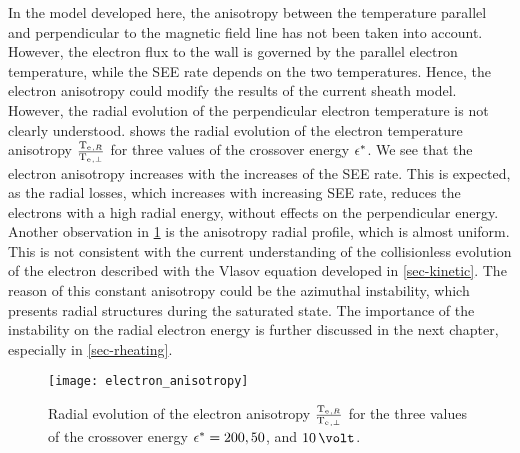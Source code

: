 \vspace{1ex}
In the model developed here, the anisotropy between the temperature parallel and perpendicular to the magnetic field line has not been taken into account.
However, the electron flux to the wall is governed by the parallel electron temperature, while the \ac{SEE} rate depends on the two temperatures.
Hence, the electron anisotropy could modify the results of the current sheath model.
However, the radial evolution of the perpendicular electron temperature is not clearly understood.
 shows the radial evolution of the electron temperature anisotropy  $\frac{\mathrm{T_e}{}_{, R}}{\mathrm{T_e}{}_{, \perp}}$ for three values of the crossover energy $\epsilon^{*}$.
We see that the electron anisotropy increases with the increases of the \ac{SEE} rate.
This is expected, as the radial losses, which increases with increasing \ac{SEE} rate, reduces the electrons with a high radial energy, without effects on the perpendicular energy.
Another observation in \cref{fig-anisotropy} is the anisotropy radial profile, which is almost uniform.
This is not consistent with the current understanding of the collisionless evolution of the electron described with the Vlasov equation developed in \cref{sec-kinetic}.
The reason of this constant anisotropy could be the azimuthal instability, which presents radial structures during the saturated state.
The importance of the instability on the radial electron energy is further discussed in the next chapter, especially in \cref{sec-rheating}.





\begin{figure}[!ht]
  \centering
  \texttt{[image: electron\_anisotropy]}
  \caption{Radial evolution of the electron anisotropy $\frac{\mathrm{T_e}{}_{, R}}{\mathrm{T_e}{}_{, \perp}}$ for the three values of the crossover energy $\epsilon^{*}=200, 50$, and $10\,\volt$.}
  \label{fig-anisotropy}
\end{figure}